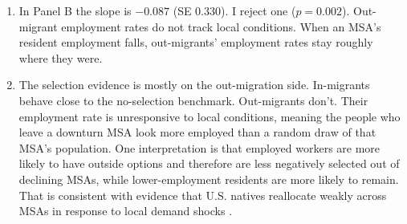 \documentclass{article}
\begin{document}
\begin{enumerate}[leftmargin=*]
\begin{enumerate}[label=(\roman*)]
    Under the no-selection benchmark in the prompt, mover employment-rate changes should track resident employment-rate changes for the focal MSA. For in-migrants, the focal MSA is the destination; for out-migrants, it is the origin. A slope of one therefore means that mover employment changes one-for-one with resident employment.

    In Panel A the slope is 1.267 (SE 0.305). I cannot reject the no-selection benchmark of one ($p=0.385$). The estimate is consistent with in-migrant employment rates co-moving roughly one-for-one with resident rates across MSAs, but the standard error leaves room for modest selection in either direction.

    \item 

    In Panel B the slope is $-0.087$ (SE 0.330). I reject one ($p=0.002$). Out-migrant employment rates do not track local conditions. When an MSA's resident employment falls, out-migrants' employment rates stay roughly where they were.

    \item 

    The selection evidence is mostly on the out-migration side. In-migrants behave close to the no-selection benchmark. Out-migrants don't. Their employment rate is unresponsive to local conditions, meaning the people who leave a downturn MSA look more employed than a random draw of that MSA's population. 
    One interpretation is that employed workers are more likely to have outside options and therefore are less negatively selected out of declining MSAs, while lower-employment residents are more likely to remain. That is consistent with evidence that U.S. natives reallocate weakly across MSAs in response to local demand shocks \cite{cadena_immigrants_2016}.
\end{enumerate}

\end{enumerate}

\clearpage



\end{document}
